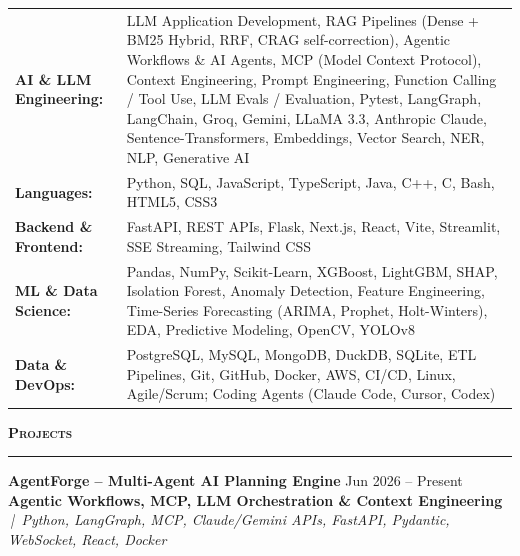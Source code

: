 \documentclass[a4paper,10pt]{article}
\newcommand{\sectionHeader}[2]{%
  \vspace{2.5pt}%
  \noindent%
  {\normalsize\bfseries\color{HeaderDark}#2\enspace\textsc{#1}}%
  \\[-6pt]%
  {\color{SectionLine}\rule{\textwidth}{1pt}}%
  \vspace{1pt}\par%
}
\newcommand{\projectEntry}[4]{%
  \vspace{1pt}%
  \noindent\textbf{\color{HeaderDark}#1} \hfill {\small\color{SubText}#2}\\[-4pt]%
  {\scriptsize\color{AccentTeal}\textbf{#3}} {\scriptsize\color{TechTag}\textit{\,|\, #4}}%
  \vspace{0pt}\par%
}
\begin{document}
\vspace{1pt}
\begin{tabularx}{\textwidth}{@{}l X@{}}
  {\small\textbf{\color{HeaderDark}AI \& LLM Engineering:}} & {\small LLM Application Development, RAG Pipelines (Dense + BM25 Hybrid, RRF, CRAG self-correction), Agentic Workflows \& AI Agents, MCP (Model Context Protocol), Context Engineering, Prompt Engineering, Function Calling / Tool Use, LLM Evals / Evaluation, Pytest, LangGraph, LangChain, Groq, Gemini, LLaMA 3.3, Anthropic Claude, Sentence-Transformers, Embeddings, Vector Search, NER, NLP, Generative AI} \\[1pt]
  {\small\textbf{\color{HeaderDark}Languages:}} & {\small Python, SQL, JavaScript, TypeScript, Java, C++, C, Bash, HTML5, CSS3} \\[1pt]
  {\small\textbf{\color{HeaderDark}Backend \& Frontend:}} & {\small FastAPI, REST APIs, Flask, Next.js, React, Vite, Streamlit, SSE Streaming, Tailwind CSS} \\[1pt]
  {\small\textbf{\color{HeaderDark}ML \& Data Science:}} & {\small Pandas, NumPy, Scikit-Learn, XGBoost, LightGBM, SHAP, Isolation Forest, Anomaly Detection, Feature Engineering, Time-Series Forecasting (ARIMA, Prophet, Holt-Winters), EDA, Predictive Modeling, OpenCV, YOLOv8} \\[1pt]
  {\small\textbf{\color{HeaderDark}Data \& DevOps:}} & {\small PostgreSQL, MySQL, MongoDB, DuckDB, SQLite, ETL Pipelines, Git, GitHub, Docker, AWS, CI/CD, Linux, Agile/Scrum; Coding Agents (Claude Code, Cursor, Codex)} \\
\end{tabularx}


\sectionHeader{Projects}{\faProjectDiagram}

\projectEntry{AgentForge -- Multi-Agent AI Planning Engine}
  {Jun 2026 -- Present}
  {Agentic Workflows, MCP, LLM Orchestration \& Context Engineering}
  {Python, LangGraph, MCP, Claude/Gemini APIs, FastAPI, Pydantic, WebSocket, React, Docker}
\end{document}
